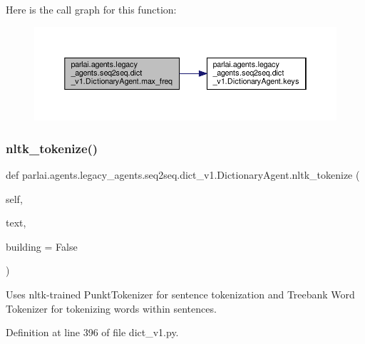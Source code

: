 Here is the call graph for this function\+:
\nopagebreak
\begin{figure}[H]
\begin{center}
\leavevmode
\includegraphics[width=350pt]{classparlai_1_1agents_1_1legacy__agents_1_1seq2seq_1_1dict__v1_1_1DictionaryAgent_a401e9c33a2b503efb53ec0c6cedc2f8e_cgraph}
\end{center}
\end{figure}
\mbox{\label{classparlai_1_1agents_1_1legacy__agents_1_1seq2seq_1_1dict__v1_1_1DictionaryAgent_a63a722c3a9b9ff68a06479e2e6539fd8}} 
\subsubsection{\texorpdfstring{nltk\+\_\+tokenize()}{nltk\_tokenize()}}
{\footnotesize\ttfamily def parlai.\+agents.\+legacy\+\_\+agents.\+seq2seq.\+dict\+\_\+v1.\+Dictionary\+Agent.\+nltk\+\_\+tokenize (\begin{DoxyParamCaption}\item[{}]{self,  }\item[{}]{text,  }\item[{}]{building = {\ttfamily False} }\end{DoxyParamCaption})}

\begin{DoxyVerb}Uses nltk-trained PunktTokenizer for sentence tokenization and
Treebank Word Tokenizer for tokenizing words within sentences.
\end{DoxyVerb}
 

Definition at line 396 of file dict\+\_\+v1.\+py.



